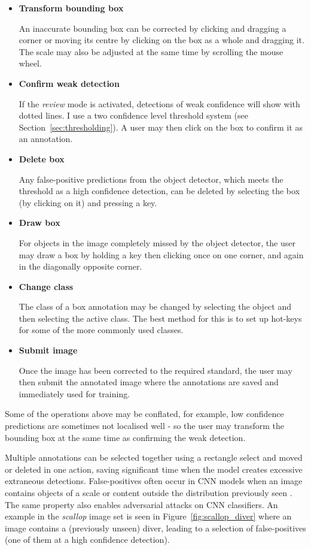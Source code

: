 \begin{itemize}
    \item {\bf Transform bounding box}\par
An inaccurate bounding box can be corrected by clicking and dragging a corner or moving its centre by clicking on the box as a whole and dragging it. The scale may also be adjusted at the same time by scrolling the mouse wheel.
    \item {\bf Confirm weak detection}\par
If the \emph{review} mode is activated, detections of weak confidence will show with dotted lines. I use a two confidence level threshold system (see Section~\ref{sec:thresholding}). A user may then click on the box to confirm it as an annotation.
    \item {\bf Delete box}\par
Any false-positive predictions from the object detector, which meets the threshold as a high confidence detection, can be deleted by selecting the box (by clicking on it) and pressing a key. 
    \item {\bf Draw box}\par
For objects in the image completely missed by the object detector, the user may draw a box by holding a key then clicking once on one corner, and again in the diagonally opposite corner.
    \item {\bf Change class}\par
The class of a box annotation may be changed by selecting the object and then selecting the active class. The best method for this is to set up hot-keys for some of the more commonly used classes.
    \item {\bf Submit image}\par
Once the image has been corrected to the required standard, the user may then submit the annotated image where the annotations are saved and immediately used for training.
\end{itemize}

Some of the operations above may be conflated, for example, low confidence predictions are sometimes not localised well - so the user may transform the bounding box at the same time as confirming the weak detection.


Multiple annotations can be selected together using a rectangle select and moved or deleted in one action, saving significant time when the model creates excessive extraneous detections. False-positives often occur in \gls{CNN} models when an image contains objects of a scale or content outside the distribution previously seen \cite{Hendrycks2016,Lee2018}. The same property also enables adversarial attacks on \gls{CNN} classifiers. An example in the \emph{scallop} image set is seen in Figure~\ref{fig:scallop_diver} where an image contains a (previously unseen) diver, leading to a selection of false-positives (one of them at a high confidence detection).


